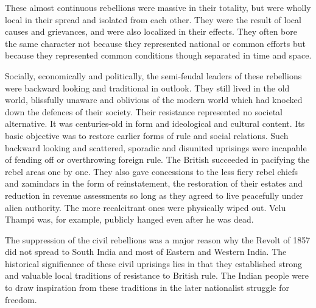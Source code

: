 These almost continuous rebellions were massive in their totality, but were wholly local in their spread and isolated from each other. They were the result of local causes and grievances, and were also localized in their effects. They often bore the same character not because they represented national or common efforts but because they represented common conditions though separated in time and space.

Socially, economically and politically, the semi-feudal leaders of these rebellions were backward looking and traditional in outlook. They still lived in the old world, blissfully unaware and oblivious of the modern world which had knocked down the defences of their society. Their resistance represented no societal alternative. It was centuries-old in form and ideological and cultural content. Its basic objective was to restore earlier forms of rule and social relations. Such backward looking and scattered, sporadic and disunited uprisings were incapable of fending off or overthrowing foreign rule. The British succeeded in pacifying the rebel areas one by one. They also gave concessions to the less fiery rebel chiefs and zamindars in the form of reinstatement, the restoration of their estates and reduction in revenue assessments so long as they agreed to live peacefully under alien authority. The more recalcitrant ones were physically wiped out. Velu Thampi was, for example, publicly hanged even after he was dead.

The suppression of the civil rebellions was a major reason why the Revolt of 1857 did not spread to South India and most of Eastern and Western India. The historical significance of these civil uprisings lies in that they established strong and valuable local traditions of resistance to British rule. The Indian people were to draw inspiration from these traditions in the later nationalist struggle for freedom.

